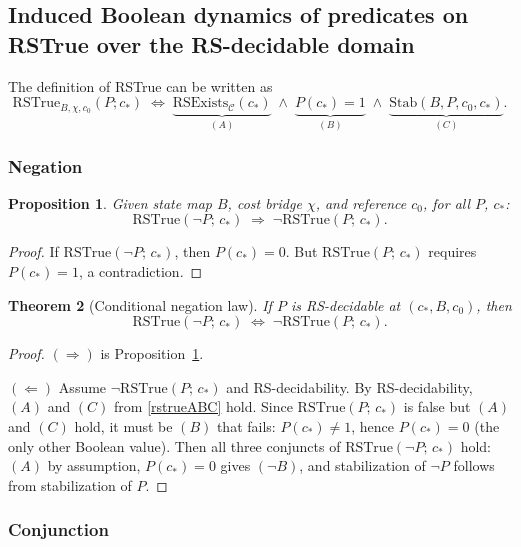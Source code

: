 \documentclass[11pt,a4paper]{article}
\newcommand{\RSExists}{\mathrm{RSExists}}
\newcommand{\RSTrue}{\mathrm{RSTrue}}
\newcommand{\Stab}{\mathrm{Stab}}
\newcommand{\Ccfg}{\mathcal{C}}
\newtheorem{theorem}{Theorem}[section]
\newtheorem{proposition}[theorem]{Proposition}
\begin{document}
\subsection{Induced Boolean dynamics of predicates on RSTrue over the RS-decidable domain}
The definition of RSTrue can be written as
\begin{equation}
    \RSTrue_{B,\chi,c_0}(P;c_*)
  \;\Longleftrightarrow\;
  \underbrace{\RSExists_\Ccfg(c_*)}_{(A)}
  \;\land\;
  \underbrace{P(c_*)=1}_{(B)}
  \;\land\;
  \underbrace{\Stab(B,P,c_0,c_*)}_{(C)}. \label{rstrueABC}
\end{equation}  
\subsubsection{Negation}
\begin{proposition}\label{prop:oneway}
Given state map $B$, cost bridge $\chi$, and reference $c_0$, for all $P$, $c_*$:
\[
  \RSTrue(\neg P;\,c_*)
  \;\Longrightarrow\;
  \neg\RSTrue(P;\,c_*).
\]
\end{proposition}
\begin{proof}
If $\RSTrue(\neg P;\,c_*)$, then $P(c_*)=0$.  But $\RSTrue(P;\,c_*)$
requires $P(c_*)=1$, a contradiction.
\end{proof}

\begin{theorem}[Conditional negation law]\label{thm:neglaw}
If $P$ is RS-decidable at $(c_*,B,c_0)$, then
\[
  \RSTrue(\neg P;\,c_*)
  \;\Longleftrightarrow\;
  \neg\RSTrue(P;\,c_*).
\]
\end{theorem}
\begin{proof}
$(\Rightarrow)$ is Proposition~\ref{prop:oneway}.

$(\Leftarrow)$  Assume $\neg\RSTrue(P;\,c_*)$ and RS-decidability.
By RS-decidability, $(A)$ and $(C)$ from \ref{rstrueABC} hold.  Since $\RSTrue(P;\,c_*)$
is false but $(A)$ and $(C)$ hold, it must be $(B)$ that fails:
$P(c_*)\ne 1$, hence $P(c_*)=0$ (the only other Boolean value).
Then all three conjuncts of $\RSTrue(\neg P;\,c_*)$ hold:
$(A)$ by assumption, $P(c_*)=0$ gives $(\neg B)$, and
stabilization of $\neg P$ follows from stabilization of $P$.
\end{proof}

\subsubsection{Conjunction}
\end{document}
